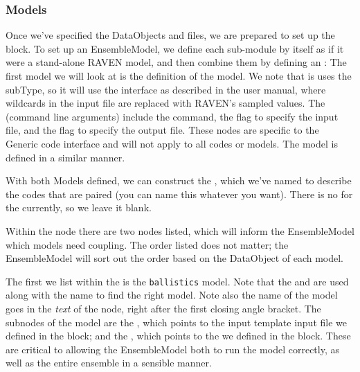 \subsubsection{Models}
Once we've specified the DataObjects and files, we are prepared to set up the  block.  To set
up an EnsembleModel, we define each sub-module by itself as if it were a stand-alone RAVEN model, and then
combine them by defining an :
The first model we will look at is the definition of the  model.  We note that is uses
the  subType, so it will use the interface as described in the user manual, where
wildcards in the input file are replaced with RAVEN's sampled values.  The  (command line
arguments) include the  command, the  flag to specify the input file, and the
 flag to specify the output file.  These nodes are specific to the Generic code interface and
will not apply to all codes or models. The  model is defined in a similar manner.

With both Models defined, we can construct the , which we've named
 to describe the codes that are paired (you can name this whatever you
want).  There is no  for the  currently, so we leave it blank.

Within the  node there are two  nodes listed, which will inform the
EnsembleModel which models need coupling.  The order listed does not matter; the EnsembleModel will sort out
the order based on the  DataObject of each model.

The first  we list within the  is the \texttt{ballistics} model.  Note
that the  and  are used along with the name to find the right model.  Note also
the name of the model goes in the \emph{text} of the  node, right after the first closing angle
bracket.  The subnodes of the  model are the , which points to the input
template input file we defined in the  block; and the , which points
to the  we defined in the  block.  These are critical to allowing the
EnsembleModel both to run the  model correctly, as well as the entire ensemble in a
sensible manner.

